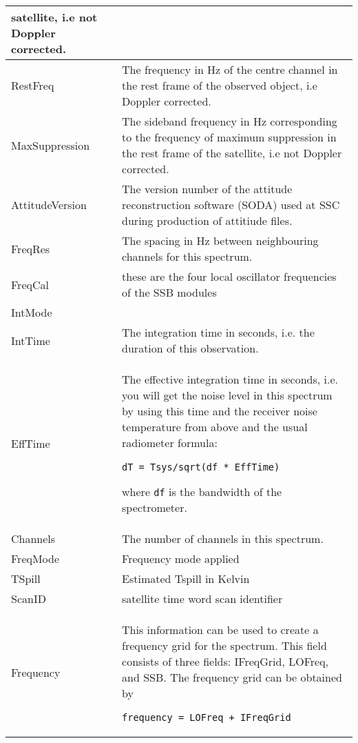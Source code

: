 \begin{longtable}{| p{} | p{} |}
                         satellite, i.e not Doppler corrected.\\ \hline
     RestFreq        & The frequency in Hz of the centre channel in the rest frame of the
                         observed object, i.e Doppler corrected.\\ \hline
     MaxSuppression  & The sideband frequency in Hz corresponding to the frequency of
                        maximum suppression in the rest frame of the satellite,
                        i.e not Doppler corrected.\\ \hline
     AttitudeVersion & The version number of the attitude reconstruction software (SODA) 
                         used at SSC during production of attitiude files.\\  \hline
     FreqRes         & The spacing in Hz between neighbouring channels for this spectrum. \\ \hline
     FreqCal         & these are the four local oscillator frequencies of the SSB modules\\ \hline
     IntMode         & \\ \hline
     IntTime         & The integration time in seconds, i.e. the duration of this observation.\\ \hline
     EffTime         & The effective integration time in seconds, i.e. you will get the
                         noise level in this spectrum by using this time and the receiver noise 
                         temperature from above and the usual radiometer formula:
                        \begin{verbatim}dT = Tsys/sqrt(df * EffTime)\end{verbatim}
                         where {\tt df} is the bandwidth of the spectrometer.\\ \hline
     Channels        & The number of channels in this spectrum.\\ \hline
     FreqMode        & Frequency mode applied\\ \hline
     TSpill          & Estimated Tspill in Kelvin \\ \hline
     ScanID          & satellite time word scan identifier\\ \hline
     Frequency       & This information can be used to create a frequency grid for the spectrum.
                       This field consists of three fields: IFreqGrid, LOFreq, and SSB.
                       The frequency grid can be obtained by
                       \begin{verbatim}frequency = LOFreq + IFreqGrid\end{verbatim}

\end{longtable}
